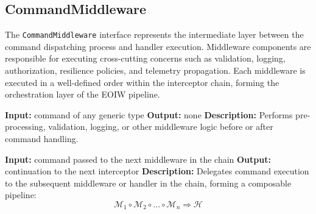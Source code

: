 \subsection{CommandMiddleware}

The \texttt{CommandMiddleware} interface represents the intermediate layer  between the command dispatching process and handler execution. Middleware components are responsible for executing cross-cutting concerns such as validation, logging, authorization, resilience policies, and telemetry propagation. Each middleware is executed in a well-defined order within the interceptor chain, forming the orchestration layer of the EOIW pipeline.

\begin{algorithm}[H]
\caption{CommandMiddleware (\emph{Interface})}
\begin{algorithmic}[1]
    \State \textbf{Input:} command of any generic type
    \State \textbf{Output:} none
    \State \textbf{Description:} Performs pre-processing, validation, logging, or other middleware logic before or after command handling.
\EndProcedure

    \State \textbf{Input:} command passed to the next middleware in the chain
    \State \textbf{Output:} continuation to the next interceptor
    \State \textbf{Description:} Delegates command execution to the subsequent middleware or handler in the chain, forming a composable pipeline:
    \[
        \mathcal{M}_1 \circ \mathcal{M}_2 \circ \dots \circ \mathcal{M}_n \Rightarrow \mathcal{H}
    \]
\EndProcedure
\end{algorithmic}
\end{algorithm}